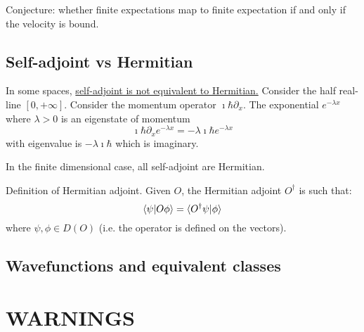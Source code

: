 Conjecture: whether finite expectations map to finite expectation if and only if the velocity is bound.




\subsection{Self-adjoint vs Hermitian}

In some spaces,  \href{https://math.stackexchange.com/questions/38387/distinguishing-between-symmetric-hermitian-and-self-adjoint-operators}{self-adjoint is not equivalent to Hermitian.} Consider the half real-line $[0, +\infty]$. Consider the momentum operator $\imath \hbar \partial_x $. The exponential $e^{-\lambda x}$ where $\lambda > 0$ is an eigenstate of momentum
\begin{equation}
	\imath \hbar \partial_x e^{-\lambda x} = - \lambda \imath \hbar e^{-\lambda x}
\end{equation}
with eigenvalue is $- \lambda \imath \hbar$ which is imaginary.

In the finite dimensional case, all self-adjoint are Hermitian.

Definition of Hermitian adjoint. Given $O$, the Hermitian adjoint $O^\dagger$ is such that:
\begin{equation}
	\langle\psi|O \phi\rangle = \langle O^\dagger \psi | \phi \rangle
\end{equation}
where $\psi, \phi \in D(O)$ (i.e. the operator is defined on the vectors).

\subsection{Wavefunctions and equivalent classes}


\section{WARNINGS}

